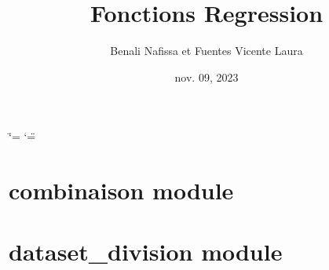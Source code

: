 \documentclass[letterpaper,10pt,french]{sphinxmanual}
\title{Fonctions Regression}
\date{nov. 09, 2023}
\author{Benali Nafissa et Fuentes Vicente Laura}
\begin{document}
\ifdefined\shorthandoff
  \ifnum\catcode`\=\string=\active\shorthandoff{=}\fi
  \ifnum\catcode`\"=\active{}\fi
\fi

\pagestyle{empty}
\sphinxmaketitle
\pagestyle{plain}
\sphinxtableofcontents
\pagestyle{normal}
\label{\detokenize{index::doc}}


\sphinxstepscope


\chapter{combinaison module}
\label{\detokenize{combinaison:combinaison-module}}\label{\detokenize{combinaison::doc}}
\sphinxstepscope


\chapter{dataset\_division module}
\label{\detokenize{dataset_division:module-dataset_division}}\label{\detokenize{dataset_division:dataset-division-module}}\label{\detokenize{dataset_division::doc}}
\end{document}
